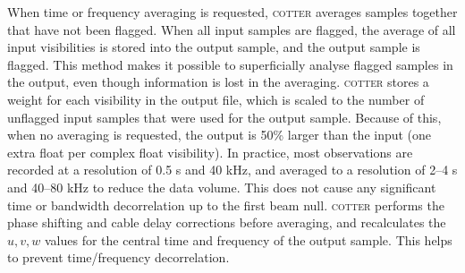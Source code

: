 \documentclass{pasa}
\begin{document}
When time or frequency averaging is requested, \textsc{cotter} averages samples together that have not been flagged. When all input samples are flagged, the average of all input visibilities is stored into the output sample, and the output sample is flagged. This method makes it possible to superficially analyse flagged samples in the output, even though information is lost in the averaging. \textsc{cotter} stores a weight for each visibility in the output file, which is scaled to the number of unflagged input samples that were used for the output sample. Because of this, when no averaging is requested, the output is 50\% larger than the input (one extra float per complex float visibility). In practice, most observations are recorded at a resolution of 0.5 s and 40 kHz, and averaged to a resolution of 2--4 s and 40--80 kHz to reduce the data volume. This does not cause any significant time or bandwidth decorrelation up to the first beam null. \textsc{cotter} performs the phase shifting and cable delay corrections before averaging, and recalculates the $u,v,w$ values for the central time and frequency of the output sample. This helps to prevent time/frequency decorrelation.
\end{document}
